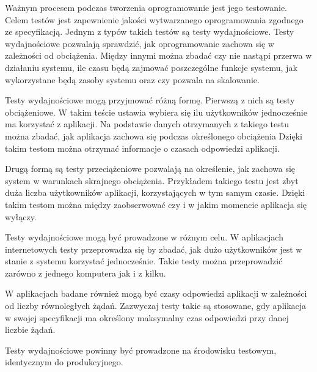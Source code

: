Ważnym procesem podczas tworzenia oprogramowanie jest jego testowanie. Celem testów jest zapewnienie jakości wytwarzanego oprogramowania zgodnego ze specyfikacją. Jednym z typów takich testów są testy wydajnościowe. Testy wydajnościowe pozwalają sprawdzić, jak oprogramowanie zachowa się w zależności od obciążenia. Między innymi można zbadać czy nie nastąpi przerwa w działaniu systemu, ile czasu będą zajmować poszczególne funkcje systemu, jak wykorzystane będą zasoby systemu oraz czy pozwala na skalowanie. 

Testy wydajnościowe mogą przyjmować różną formę. Pierwszą z nich są testy obciążeniowe. W takim teście ustawia wybiera się ilu użytkowników jednocześnie ma korzystać z aplikacji. Na podstawie danych otrzymanych z takiego testu można zbadać, jak aplikacja zachowa się podczas określonego obciążenia Dzięki takim testom można otrzymać informacje o czasach odpowiedzi aplikacji.

Drugą formą są testy przeciążeniowe pozwalają na określenie, jak zachowa się system w warunkach skrajnego obciążenia. Przykładem takiego testu jest zbyt duża liczba użytkowników aplikacji, korzystających w tym samym czasie. Dzięki takim testom można między zaobserwować czy i w jakim momencie aplikacja się wyłączy.

Testy wydajnościowe mogą być prowadzone w różnym celu. W aplikacjach internetowych testy przeprowadza się by zbadać, jak dużo użytkowników jest w stanie z systemu korzystać jednocześnie. Takie testy można przeprowadzić zarówno z jednego komputera jak i z kilku. 

W aplikacjach badane również mogą być czasy odpowiedzi aplikacji w zależności od liczby równoległych żądań. Zazwyczaj testy takie są stosowane, gdy aplikacja w swojej specyfikacji ma określony maksymalny czas odpowiedzi przy danej liczbie żądań.

Testy wydajnościowe powinny być prowadzone na środowisku testowym, identycznym do produkcyjnego.